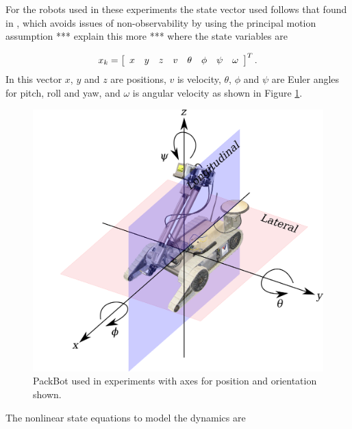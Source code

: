 For the robots used in these experiments the state vector used follows that found in \cite{Kelly_1994_338}, \cite{Kelly_1994_333} which avoids issues of non-observability by using the principal motion assumption *** explain this more *** where the state variables are

\begin{align*}
x_k = \left[\begin{array}{c c c c c c c c} x & y & z & v & \theta & \phi & \psi & \omega \end{array}\right]^T.
\end{align*}
In this vector $x$, $y$ and $z$ are positions, $v$ is velocity, $\theta$, $\phi$ and $\psi$ are Euler angles for pitch, roll and yaw, and $\omega$ is angular velocity as shown in Figure \ref{fig:robotaxes}.

\begin{figure}[ht!]
	\centering
		\includegraphics[width=.65\textwidth]{images/packbotaxes}
	\caption{PackBot used in experiments with axes for position and orientation shown.}
	\label{fig:robotaxes}
\end{figure}

The nonlinear state equations to model the dynamics are

